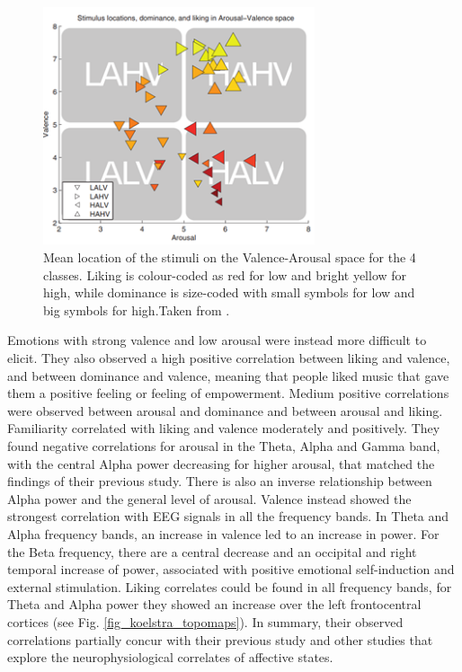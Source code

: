 \begin{figure}[h!]
\includegraphics[width=8cm]{img/related_work/koelstra_va_space.png}
\centering
\caption{ Mean location of the stimuli on the Valence-Arousal space for the 4 classes. Liking is colour-coded as red for low and bright yellow for high, while dominance is size-coded with small symbols for low and big symbols for high.Taken from \cite{koelstra_deap_2012}.}\label{fig_koelstra_va_space}
\end{figure}

Emotions with strong valence and low arousal were instead more difficult to elicit. They also observed a high positive correlation between liking and valence, and between dominance and valence, meaning that people liked music that gave them a positive feeling or feeling of empowerment. Medium positive correlations were observed between arousal and dominance and between arousal and liking. Familiarity correlated with liking and valence moderately and positively.
They found negative correlations for arousal in the Theta, Alpha and Gamma band, with the central Alpha power decreasing for higher arousal, that matched the findings of their previous study. There is also an inverse relationship between Alpha power and the general level of arousal. Valence instead showed the strongest correlation with \ac{EEG} signals in all the frequency bands. In Theta and Alpha frequency bands, an increase in valence led to an increase in power. For the Beta frequency, there are a central decrease and an occipital and right temporal increase of power, associated with positive emotional self-induction and external stimulation. Liking correlates could be found in all frequency bands, for Theta and Alpha power they showed an increase over the left frontocentral cortices (see Fig. \ref{fig_koelstra_topomaps}). In summary, their observed correlations partially concur with their previous study and other studies that explore the neurophysiological correlates of affective states. 

